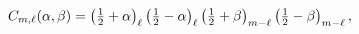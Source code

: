\[C_{m,\ell}(\alpha,\beta)=\left(\tfrac{1}{2}+\alpha\right)_{\ell}\left(\tfrac{1%
}{2}-\alpha\right)_{\ell}\left(\tfrac{1}{2}+\beta\right)_{m-\ell}\left(\tfrac{%
1}{2}-\beta\right)_{m-\ell},\]